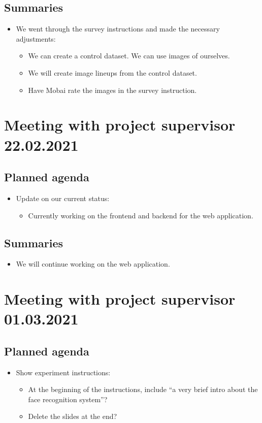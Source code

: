 \subsection*{Summaries}
\begin{itemize}
    \item We went through the survey instructions and made the necessary adjustments:
    \begin{itemize}
        \item We can create a control dataset. We can use images of ourselves.
        \item We will create image lineups from the control dataset.
        \item Have Mobai rate the images in the survey instruction.
    \end{itemize}
\end{itemize}



\section*{Meeting with project supervisor 22.02.2021}
\subsection*{Planned agenda}
\begin{itemize}
    \item Update on our current status:
    \begin{itemize}
        \item Currently working on the frontend and backend for the web application.
    \end{itemize}
\end{itemize}

\subsection*{Summaries}
\begin{itemize}
    \item We will continue working on the web application.
\end{itemize}



\section*{Meeting with project supervisor 01.03.2021}
\subsection*{Planned agenda}
\begin{itemize}
    \item Show experiment instructions:
    \begin{itemize}
        \item At the beginning of the instructions, include “a very brief intro about the face recognition system”?
        \item Delete the slides at the end?
    \end{itemize}
\end{itemize}

